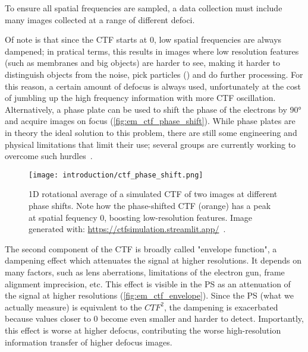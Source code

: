To ensure all spatial frequencies are sampled, a data collection must include many images collected at a range of different defoci.

Of note is that since the CTF starts at \num{0}, low spatial frequencies are always dampened; in pratical terms, this results in images where low resolution features (such as membranes and big objects) are harder to see, making it harder to distinguish objects from the noise, pick particles () and do further processing.
For this reason, a certain amount of defocus is always used, unfortunately at the cost of jumbling up the high frequency information with more CTF oscillation.
Alternatively, a phase plate can be used to shift the phase of the electrons by \ang{90} and acquire images on focus (\autoref{fig:em_ctf_phase_shift}).
While phase plates are in theory the ideal solution to this problem, there are still some engineering and physical limitations that limit their use; several groups are currently working to overcome such hurdles~\cite{danevExpandingBoundariesCryoEM2017,schwartzLaserPhasePlate2019}.

\begin{figure}[ht]
    \centering
    \texttt{[image: introduction/ctf\_phase\_shift.png]}
    \caption[CTF: effect of phase shift]{1D rotational average of a simulated CTF of two images at different phase shifts. Note how the phase-shifted CTF (orange) has a peak at spatial fequency \num{0}, boosting low-resolution features. Image generated with: \url{https://ctfsimulation.streamlit.app/}~\cite{jiangWebbasedSimulationContrast2001}.}
    \label{fig:em_ctf_phase_shift}
\end{figure}

The second component of the CTF is broadly called "envelope function", a dampening effect which attenuates the signal at higher resolutions.
It depends on many factors, such as lens aberrations, limitations of the electron gun, frame alignment imprecision, etc.
This effect is visible in the PS as an attenuation of the signal at higher resolutions (\autoref{fig:em_ctf_envelope}).
Since the PS (what we actually measure) is equivalent to the $CTF^2$, the dampening is exacerbated because values closer to \num{0} become even smaller and harder to detect.
Importantly, this effect is worse at higher defocus, contributing the worse high-resolution information transfer of higher defocus images.

